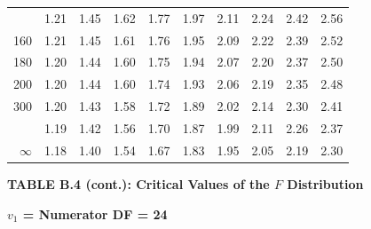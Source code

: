 \documentclass[10pt]{article}
\begin{document}
\begin{longtable}{@{}r!{\vrule width 0.8pt\hspace{0.55em}}rrrrrrrrr@{}}
 & 1.21 & 1.45 & 1.62 & 1.77 & 1.97 & 2.11 & 2.24 & 2.42 & 2.56 \\
160 & 1.21 & 1.45 & 1.61 & 1.76 & 1.95 & 2.09 & 2.22 & 2.39 & 2.52 \\
180 & 1.20 & 1.44 & 1.60 & 1.75 & 1.94 & 2.07 & 2.20 & 2.37 & 2.50 \\
200 & 1.20 & 1.44 & 1.60 & 1.74 & 1.93 & 2.06 & 2.19 & 2.35 & 2.48 \\
300 & 1.20 & 1.43 & 1.58 & 1.72 & 1.89 & 2.02 & 2.14 & 2.30 & 2.41 \\
 & 1.19 & 1.42 & 1.56 & 1.70 & 1.87 & 1.99 & 2.11 & 2.26 & 2.37 \\
$\infty$ & 1.18 & 1.40 & 1.54 & 1.67 & 1.83 & 1.95 & 2.05 & 2.19 & 2.30 \\
\end{longtable}
\newpage
\thispagestyle{empty}
\begin{center}
{\large\bfseries TABLE B.4 (cont.): Critical Values of the $F$ Distribution\par}
\end{center}
{\large\bfseries $v_1$ = Numerator DF = 24\par}
\vspace{0.5em}
\small
\end{document}
